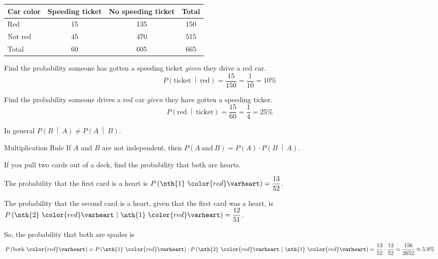 \documentclass{beamer}
\newcommand{\suitheart}[1][]{{\color{red}\text{#1}\varheart}}
\newcommand{\prob}[1]{P\left(#1\right)}
\newcommand{\condprob}[2]{\prob{#1~\middle|~#2}}
\begin{document}
\begin{frame}
\begin{example}
\begin{center}
\begin{tabular}{|l|c|c|c|}
\hline
Car color & Speeding ticket & No speeding ticket & Total \\ \hline
Red & 15 & 135 & 150 \\ \hline
Not red & 45 & 470 & 515 \\ \hline
Total & 60 & 605 & 665 \\ \hline
\end{tabular}
\end{center}

Find the probability someone has gotten a speeding ticket \emph{given} they drive a red car.\pause
\begin{equation*}
\condprob{\text{ticket}}{\text{red}} = \dfrac{15}{150} = \dfrac{1}{10} = 10\%
\end{equation*}\pause

Find the probability someone drives a red car \emph{given} they have gotten a speeding ticker.\pause
\begin{equation*}
\condprob{\text{red}}{\text{ticket}} = \dfrac{15}{60} = \dfrac{1}{4} = 25\%
\end{equation*}
\end{example}\pause

\begin{note}
In general $\condprob{B}{A}\neq\condprob{A}{B}$.
\end{note}
\end{frame}

\begin{frame}
\begin{block}{Multiplication Rule}
If $A$ and $B$ are not independent, then $\prob{A~\text{and}~B}=\prob{A}\cdot\condprob{B}{A}$.
\end{block}\pause

\begin{example}
If you pull two cards out of a deck, find the probability that both are hearts.\pause

\vspace{2mm}
The probability that the first card is a heart is $\prob{\text{\nth{1} $\suitheart$}}=\dfrac{13}{52}$.\pause

\vspace{2mm}
The probability that the second card is a heart, given that the first card was a heart, is $\condprob{\text{\nth{2} $\suitheart$}}{\text{\nth{1} $\suitheart$}}=\dfrac{12}{51}$.\pause

\vspace{2mm}
So, the probability that both are spades is
\begin{equation*}
\prob{\text{both $\suitheart$}}=\prob{\text{\nth{1} $\suitheart$}}\cdot\condprob{\text{\nth{2} $\suitheart$}}{\text{\nth{1} $\suitheart$}} =  \dfrac{13}{52} \cdot \dfrac{12}{52} = \dfrac{156}{2652} \approx 5.9\%
\end{equation*}
\end{example}
\end{frame}
\end{document}
